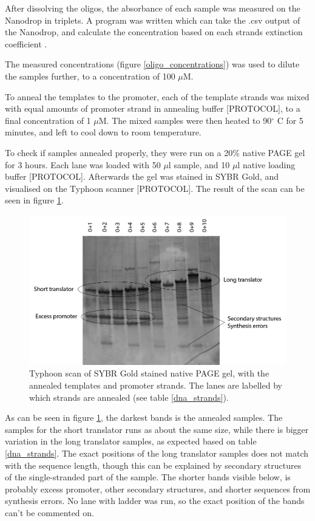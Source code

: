 After dissolving the oligos, the absorbance of each sample was measured on the Nanodrop in triplets. A program was written which can take the .csv output of the Nanodrop, and calculate the concentration based on each strands extinction coefficient \cite{nanodropimport}.

The measured concentrations (figure \ref{oligo_concentrations}) was used to dilute the samples further, to a concentration of 100 $\mu$M.

To anneal the templates to the promoter, each of the template strands was mixed with equal amounts of promoter strand in annealing buffer [PROTOCOL], to a final concentration of 1 $\mu$M. The mixed samples were then heated to 90$^\circ$ C for 5 minutes, and left to cool down to room temperature.

To check if samples annealed properly, they were run on a 20\% native PAGE gel for 3 hours. Each lane was loaded with 50 $\mu$l sample, and 10 $\mu$l native loading buffer [PROTOCOL]. Afterwards the gel was stained in SYBR Gold, and visualised on the Typhoon scanner [PROTOCOL]. The result of the scan can be seen in figure \ref{fig:promoter_annealing_gel}.

\begin{figure}[H]
\centering
\includegraphics[width=\columnwidth]{images/promoter_annealing_gel.png}
\caption{Typhoon scan of SYBR Gold stained native PAGE gel, with the annealed templates and promoter strands. The lanes are labelled by which strands are annealed (see table \ref{dna_strands}).}
\label{fig:promoter_annealing_gel}
\end{figure}

As can be seen in figure \ref{fig:promoter_annealing_gel}, the darkest bands is the annealed samples. The samples for the short translator runs as about the same size, while there is bigger variation in the long translator samples, as expected based on table \ref{dna_strands}. The exact positions of the long translator samples does not match with the sequence length, though this can be explained by secondary structures of the single-stranded part of the sample. The shorter bands visible below, is probably excess promoter, other secondary structures, and shorter sequences from synthesis errors. No lane with ladder was run, so the exact position of the bands can't be commented on.


